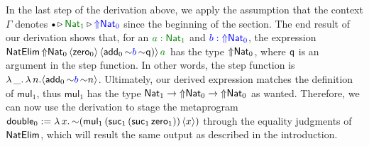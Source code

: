 In the last step of the derivation above, we apply the assumption that the context $\Gamma$ denotes $\emptycon\ext\textcolor{green}{\Nat_1}\ext\textcolor{blue}{\Lift\Nat_0}$ since the beginning of the section. The end result of our derivation shows that, for an $\textcolor{green}{a:\Nat_1}$ and $\textcolor{blue}{b:{\Uparrow}\mathsf{Nat}_0}$, the expression $\NatElim\,\Lift\Nat_0\,\qut{\mathsf{zero}_0}\,\qut{\mathsf{add}_0\,\spl\textcolor{blue}{b}\,\spl\q)}\,\textcolor{green}{a}$ has the type ${\Uparrow}\mathsf{Nat}_0$, where $\mathsf{q}$ is an argument in the step function. In other words, the step function is $\lambda\,\_.\,\lambda\,n.\langle \mathsf{add}_0\,{\sim}\textcolor{blue}{b}\,{\sim} n\rangle$. Ultimately, our derived expression matches the definition of $\mathsf{mul}_1$, thus $\mathsf{mul}_1$ has the type $\mathsf{Nat}_1\to{\Uparrow}\mathsf{Nat}_0\to{\Uparrow}\mathsf{Nat}_0$ as wanted. Therefore, we can now use the derivation to stage the metaprogram $\mathsf{double}_0:=\lambda\,x.\,{\sim}(\mathsf{mul}_1\,(\mathsf{suc}_1\,(\mathsf{suc}_1\,\mathsf{zero}_1))\,\langle x\rangle)$ through the equality judgments of $\mathsf{NatElim}$, which will result the same output as described in the introduction.

